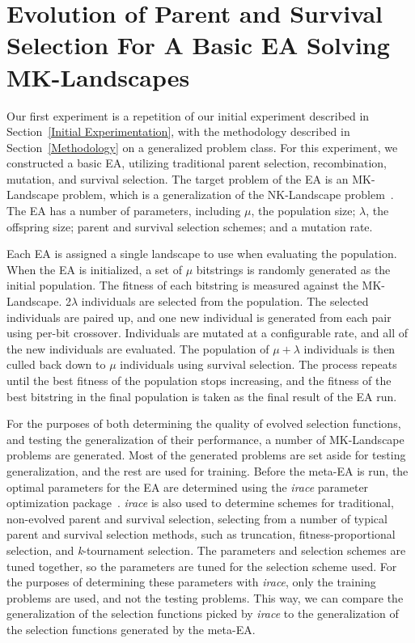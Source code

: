 \documentclass[times,12pt,titlepage]{mstogs}
\begin{document}
\begin{ThesisBody}
\begin{table}
\begin{tabular}{c|c}
  \bottomrule
\end{tabular}
\end{table}

\section{Evolution of Parent and Survival Selection For A Basic EA Solving MK-Landscapes}
\label{Evolution of Parent and Survival Selection For A Basic EA Solving MK-Landscapes}

Our first experiment is a repetition of our initial experiment described in Section~\ref{Initial Experimentation}, with the methodology described in Section~\ref{Methodology} on a generalized problem class. For this experiment, we constructed a basic EA, utilizing traditional parent selection, recombination, mutation, and survival selection. The target problem of the EA is an MK-Landscape problem, which is a generalization of the NK-Landscape problem~\citep{whitley2016gray,kaufmann1993origins}. The EA has a number of parameters, including $\mu$, the population size; $\lambda$, the offspring size; parent and survival selection schemes; and a mutation rate. 

Each EA is assigned a single landscape to use when evaluating the population. When the EA is initialized, a set of $\mu$ bitstrings is randomly generated as the initial population. The fitness of each bitstring is measured against the MK-Landscape. 2$\lambda$ individuals are selected from the population. The selected individuals are paired up, and one new individual is generated from each pair using per-bit crossover. Individuals are mutated at a configurable rate, and all of the new individuals are evaluated. The population of $\mu+\lambda$ individuals is then culled back down to $\mu$ individuals using survival selection. The process repeats until the best fitness of the population stops increasing, and the fitness of the best bitstring in the final population is taken as the final result of the EA run.

For the purposes of both determining the quality of evolved selection functions, and testing the generalization of their performance, a number of MK-Landscape problems are generated. Most of the generated problems are set aside for testing generalization, and the rest are used for training. Before the meta-EA is run, the optimal parameters for the EA are determined using the \textit{irace} parameter optimization package~\citep{irace}. \textit{irace} is also used to determine schemes for traditional, non-evolved parent and survival selection, selecting from a number of typical parent and survival selection methods, such as truncation, fitness-proportional selection, and \textit{k}-tournament selection. The parameters and selection schemes are tuned together, so the parameters are tuned for the selection scheme used. For the purposes of determining these parameters with \textit{irace}, only the training problems are used, and not the testing problems. This way, we can compare the generalization of the selection functions picked by \textit{irace} to the generalization of the selection functions generated by the meta-EA.


\end{ThesisBody}
\end{document}
